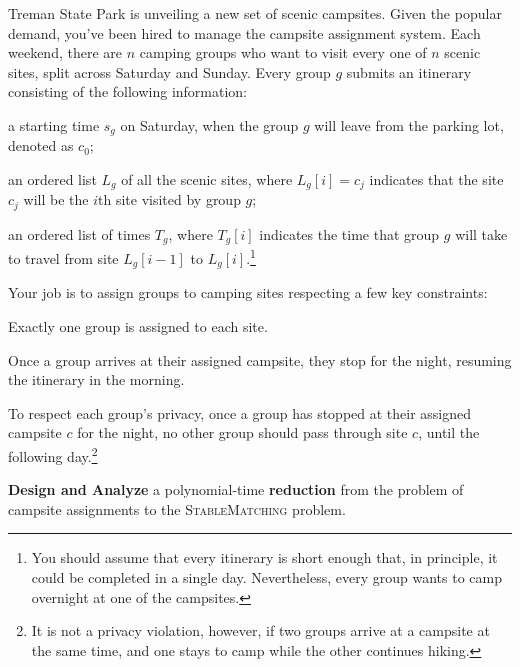 \documentclass[11pt]{article}
\begin{document}
Treman State Park is unveiling a new set of scenic campsites. 
Given the popular demand, you’ve been hired to manage the campsite assignment system.
Each weekend, there are $n$ camping groups who want to visit every one of $n$ scenic sites, split across Saturday and Sunday.
Every group $g$ submits an itinerary consisting of the following information:
\begin{compactitem}
\item a starting time $s_g$ on Saturday, when the group $g$ will leave from the parking lot, denoted as $c_0$;
\item an ordered list $L_g$ of all the scenic sites, where $L_g[i] = c_j$ indicates that the site $c_j$ will be the $i$th site visited by group $g$;
\item an ordered list of times $T_g$, where $T_g[i]$ indicates the time that group $g$ will take to travel from site $L_g[i-1]$ to $L_g[i]$.\footnote{You should assume that every itinerary is short enough that, in principle, it could be completed in a single day. Nevertheless, every group wants to camp overnight at one of the campsites.}
\end{compactitem}

Your job is to assign groups to camping sites respecting a few key constraints:
\begin{compactitem}
    \item Exactly one group is assigned to each site.
    \item Once a group arrives at their assigned campsite, they stop for the night, resuming the itinerary in the morning.
    \item To respect each group’s privacy, once a group has stopped at their assigned campsite $c$ for the night, no other group should pass through site $c$, until the following day.\footnote{It is not a privacy violation, however, if two groups arrive at a campsite at the same time, and one stays to camp while the other continues hiking.}
\end{compactitem}

\textbf{Design and Analyze} a polynomial-time \textbf{reduction} from the problem of campsite assignments to the \textsc{StableMatching} problem.
\end{document}
